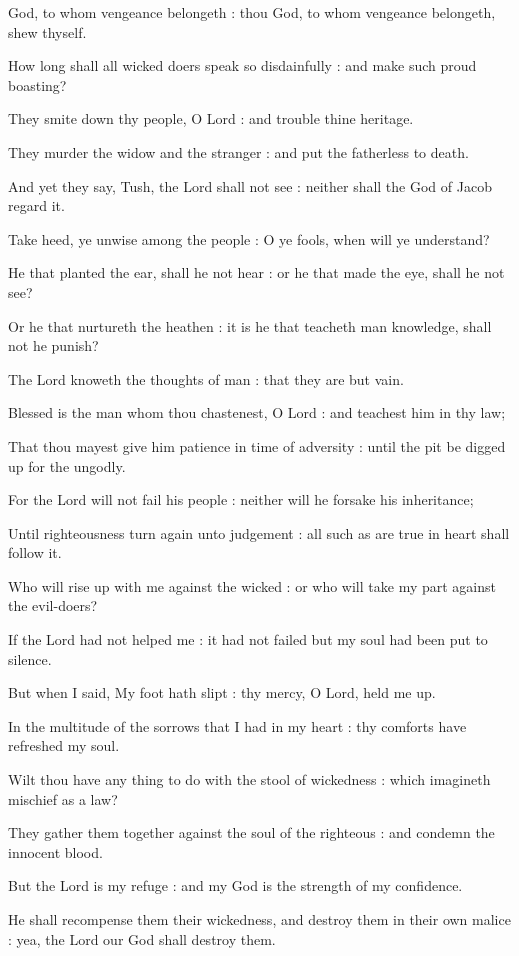  God, to whom vengeance belongeth : thou God, to whom vengeance belongeth, shew thyself.\par
{}
How long shall all wicked doers speak so disdainfully : and make such proud boasting?\par
{}They smite down thy people, O Lord : and trouble thine heritage.\par
{}They murder the widow and the stranger : and put the fatherless to death.\par
{}And yet they say, Tush, the Lord shall not see : neither shall the God of Jacob regard it.\par
{}Take heed, ye unwise among the people : O ye fools, when will ye understand?\par
{}He that planted the ear, shall he not hear : or he that made the eye, shall he not see?\par
{}Or he that nurtureth the heathen : it is he that teacheth man knowledge, shall not he punish?\par
{}The Lord knoweth the thoughts of man : that they are but vain.\par
{}Blessed is the man whom thou chastenest, O Lord : and teachest him in thy law;\par
{}That thou mayest give him patience in time of adversity : until the pit be digged up for the ungodly.\par
{}For the Lord will not fail his people : neither will he forsake his inheritance;\par
{}Until righteousness turn again unto judgement : all such as are true in heart shall follow it.\par
{}Who will rise up with me against the wicked : or who will take my part against the evil-doers?\par
{}If the Lord had not helped me : it had not failed but my soul had been put to silence.\par
{}But when I said, My foot hath slipt : thy mercy, O Lord, held me up.\par
{}In the multitude of the sorrows that I had in my heart : thy comforts have refreshed my soul.\par
{}Wilt thou have any thing to do with the stool of wickedness : which imagineth mischief as a law?\par
{}They gather them together against the soul of the righteous : and condemn the innocent blood.\par
{}But the Lord is my refuge : and my God is the strength of my confidence.\par
{}He shall recompense them their wickedness, and destroy them in their own malice : yea, the Lord our God shall destroy them.\par

